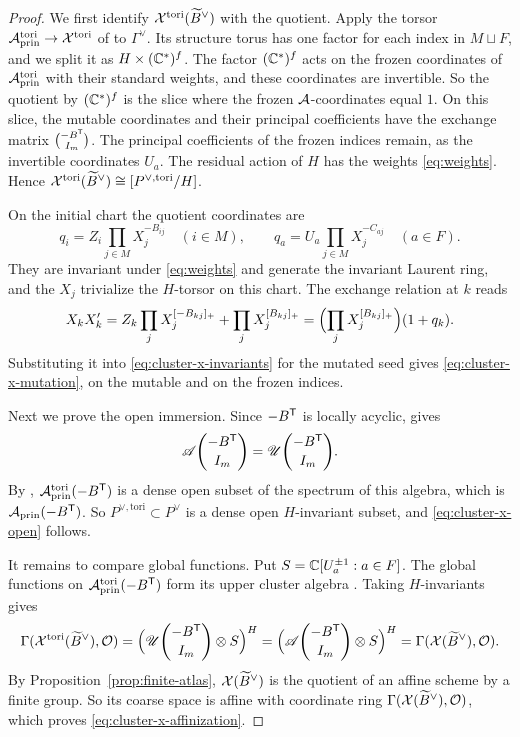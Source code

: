 \documentclass[12pt, letter]{amsart}
\theoremstyle{definition}
\begin{document}
\begin{proof}
We first identify $\mathcal{X}^{\mathrm{tori}}(\widetilde B^\vee)$ with the quotient.
Apply the torsor $\mathcal{A}^{\mathrm{tori}}_{\mathrm{prin}}\to\mathcal{X}^{\mathrm{tori}}$ of \cite[Construction~2.11]{GHK} to $\Gamma^\vee$.
Its structure torus has one factor for each index in $M\sqcup F$, and we split it as $H\times(\mathbb{C}^*)^f$.
The factor $(\mathbb{C}^*)^f$ acts on the frozen coordinates of $\mathcal{A}^{\mathrm{tori}}_{\mathrm{prin}}$ with their standard weights, and these coordinates are invertible.
So the quotient by $(\mathbb{C}^*)^f$ is the slice where the frozen $\mathcal{A}$-coordinates equal $1$.
On this slice, the mutable coordinates and their principal coefficients have the exchange matrix $\binom{-B^{\mathsf T}}{I_m}$.
The principal coefficients of the frozen indices remain, as the invertible coordinates $U_a$.
The residual action of $H$ has the weights \eqref{eq:weights}.
Hence $\mathcal{X}^{\mathrm{tori}}(\widetilde B^\vee)\cong[P^{\vee,\mathrm{tori}}/H]$.

On the initial chart the quotient coordinates are
\begin{equation}\label{eq:cluster-x-invariants}
 q_i=Z_i\prod_{j\in M}X_j^{-B_{ij}}\quad(i\in M),
 \qquad
 q_a=U_a\prod_{j\in M}X_j^{-C_{aj}}\quad(a\in F).
\end{equation}
They are invariant under \eqref{eq:weights} and generate the invariant Laurent ring, and the $X_j$ trivialize the $H$-torsor on this chart.
The exchange relation at $k$ reads
\[
 X_kX_k'
 =Z_k\prod_jX_j^{[-B_{kj}]_+}+\prod_jX_j^{[B_{kj}]_+}
 =\Bigl(\prod_jX_j^{[B_{kj}]_+}\Bigr)(1+q_k).
\]
Substituting it into \eqref{eq:cluster-x-invariants} for the mutated seed gives \eqref{eq:cluster-x-mutation}, on the mutable and on the frozen indices.

Next we prove the open immersion.
Since $-B^{\mathsf T}$ is locally acyclic, \cite{M} gives
\[
 \mathscr{A}\binom{-B^{\mathsf T}}{I_m}=\mathscr{U}\binom{-B^{\mathsf T}}{I_m}.
\]
By \cite[Theorem~3.14]{GHK}, $\mathcal{A}^{\mathrm{tori}}_{\mathrm{prin}}(-B^{\mathsf T})$ is a dense open subset of the spectrum of this algebra, which is $\mathcal{A}_{\mathrm{prin}}(-B^{\mathsf T})$.
So $P^{\vee,\mathrm{tori}}\subset P^\vee$ is a dense open $H$-invariant subset, and \eqref{eq:cluster-x-open} follows.

It remains to compare global functions.
Put $S=\mathbb{C}[U_a^{\pm1}:a\in F]$.
The global functions on $\mathcal{A}^{\mathrm{tori}}_{\mathrm{prin}}(-B^{\mathsf T})$ form its upper cluster algebra \cite[Definition~2.8, Remark~2.9]{GHK}.
Taking $H$-invariants gives
\[
 \Gamma(\mathcal{X}^{\mathrm{tori}}(\widetilde B^\vee),\mathcal{O})
 =\Bigl(\mathscr{U}\binom{-B^{\mathsf T}}{I_m}\otimes S\Bigr)^H
 =\Bigl(\mathscr{A}\binom{-B^{\mathsf T}}{I_m}\otimes S\Bigr)^H
 =\Gamma(\mathcal{X}(\widetilde B^\vee),\mathcal{O}).
\]
By Proposition~\ref{prop:finite-atlas}, $\mathcal{X}(\widetilde B^\vee)$ is the quotient of an affine scheme by a finite group.
So its coarse space is affine with coordinate ring $\Gamma(\mathcal{X}(\widetilde B^\vee),\mathcal{O})$, which proves \eqref{eq:cluster-x-affinization}.
\end{proof}
\end{document}
